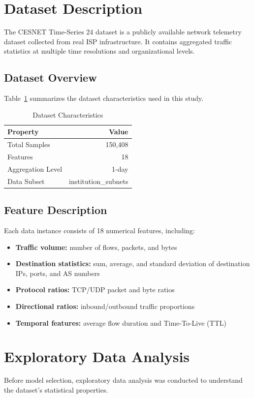\documentclass[conference]{IEEEtran}
\begin{document}
\section{Dataset Description}
The CESNET Time-Series 24 dataset is a publicly available network telemetry dataset collected from real ISP infrastructure. It contains aggregated traffic statistics at multiple time resolutions and organizational levels.

\subsection{Dataset Overview}
Table~\ref{tab:dataset} summarizes the dataset characteristics used in this study.

\begin{table}[H]
\caption{Dataset Characteristics}
\centering
\begin{tabular}{|l|r|}
\hline
\textbf{Property} & \textbf{Value} \\
\hline
Total Samples & 150,408 \\
Features & 18 \\
Aggregation Level & 1-day \\
Data Subset & institution\_subnets \\
\hline
\end{tabular}
\label{tab:dataset}
\end{table}

\subsection{Feature Description}
Each data instance consists of 18 numerical features, including:
\begin{itemize}
    \item \textbf{Traffic volume:} number of flows, packets, and bytes
    \item \textbf{Destination statistics:} sum, average, and standard deviation of destination IPs, ports, and AS numbers
    \item \textbf{Protocol ratios:} TCP/UDP packet and byte ratios
    \item \textbf{Directional ratios:} inbound/outbound traffic proportions
    \item \textbf{Temporal features:} average flow duration and Time-To-Live (TTL)
\end{itemize}

\section{Exploratory Data Analysis}
Before model selection, exploratory data analysis was conducted to understand the dataset's statistical properties.
\end{document}
